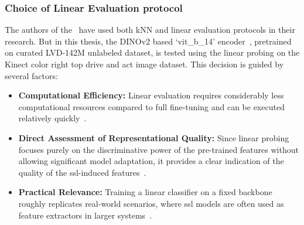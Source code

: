 \subsubsection{Choice of Linear Evaluation protocol}
The authors of the~\citep{dinov2_oquab2023dinov2} have used both kNN and linear evaluation protocols in their research. But in this thesis, the DINOv2 based `vit\_b\_14' encoder~\citep{dinov2_oquab2023dinov2}, pretrained on curated LVD-142M unlabeled dataset, is tested using the linear probing on the Kinect color right top drive and act image dataset. This decision is guided by several factors:
\begin{itemize}
    \item \textbf{Computational Efficiency:} Linear evaluation requires considerably less computational resources compared to full fine-tuning and can be executed relatively quickly~\citep{ssl_codebook_balestriero2023cookbook}.
    \item \textbf{Direct Assessment of Representational Quality:} Since linear probing focuses purely on the discriminative power of the pre-trained features without allowing significant model adaptation, it provides a clear indication of the quality of the \gls{ssl}-induced features~\citep{ssl_zhang_2016_colorful, ssl_codebook_balestriero2023cookbook}.
    \item \textbf{Practical Relevance:} Training a linear classifier on a fixed backbone roughly replicates real-world scenarios, where \gls{ssl} models are often used as feature extractors in larger systems~\citep{ssl_zhang_2017split, ssl_codebook_balestriero2023cookbook}.
\end{itemize}


